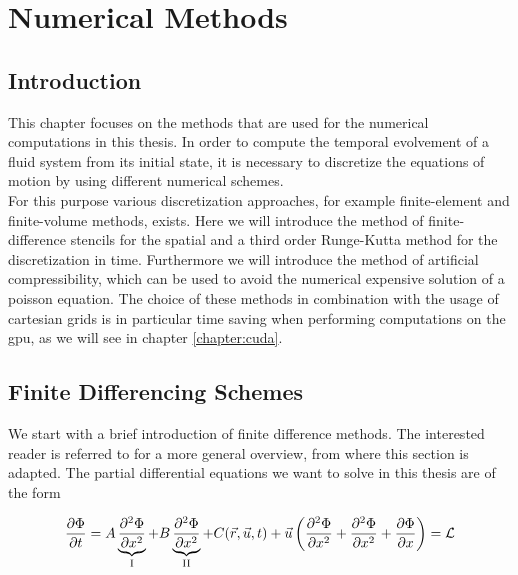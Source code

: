\chapter{Numerical Methods}

\section{Introduction}

This chapter focuses on the methods that are used for the numerical computations in this thesis.
In order to compute the temporal evolvement of a fluid system from its initial state, it is necessary to discretize
the equations of motion by using different numerical schemes.\\
For this purpose various discretization approaches, for example finite-element and finite-volume methods, exists.
Here we will introduce the method of finite-difference stencils for the spatial and a third order Runge-Kutta method for the discretization in time.
Furthermore we will introduce the method of artificial compressibility, which can be used to avoid the numerical expensive solution of a poisson equation.
The choice of these methods in combination with the usage of cartesian grids is in particular time saving when performing computations on the gpu, as we
will see in chapter \ref{chapter:cuda}.

\section{Finite Differencing Schemes}

We start with a brief introduction of finite difference methods.
The interested reader is referred to \citep{ferziger99} for a more general overview, from where this section is adapted.
The partial differential equations we want to solve in this thesis are of the form

\begin{align}
    \label{numerik:pde_allg}
    \pdn[\Phi]{t} = A \underbrace{\pdn[^2\Phi]{x^2}}_{\text{I}}  + B \underbrace{\pdn[^2\Phi]{x^2}}_{\text{II}}
     + C(\vec{r}, \vec{u}, t) +  \vec{u}\left(\pdn[^2\Phi]{x^2} +  \pdn[^2\Phi]{x^2} + \pdn[\Phi]{x}\right) = \mathcal{L}
\end{align}

